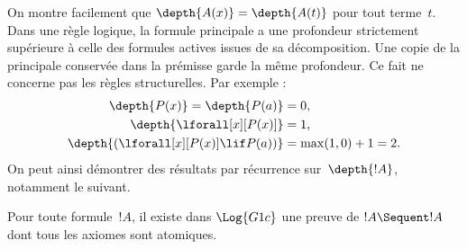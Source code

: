 \documentclass[../../../include/open-logic-section]{subfiles}
\begin{document}
On montre facilement que $\depth{A(x)} = \depth{A(t)}$
pour tout terme~$t$. Dans une règle logique,
la formule principale a une profondeur strictement
supérieure à celle des formules actives issues de
sa décomposition. Une copie de la principale
conservée dans la prémisse garde la même profondeur.
Ce fait ne concerne pas les règles structurelles.
Par exemple :
\begin{align*}
\depth{P(x)} = \depth{P(a)} & = 0,\\
\depth{\lforall[x][P(x)]} & = 1,\\
\depth{(\lforall[x][P(x)] \lif P(a))} & = \max(1,0) + 1 = 2.
\end{align*}
On peut ainsi démontrer des résultats par récurrence
sur~$\depth{!A}$, notamment le suivant.

\begin{prop}
Pour toute formule~$!A$, il existe dans $\Log{G1c}$
une preuve de $!A \Sequent !A$ dont tous les axiomes
sont atomiques.
\end{prop}
\end{document}
